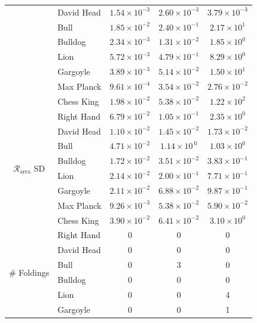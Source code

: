 \documentclass{article}
\numberwithin{equation}{section}
\begin{document}
\begin{table}[p]
{\begin{tabular}{clccc}
& David Head         &$1.54 \times 10^{-3}$  &$2.60 \times 10^{-3}$  &$3.79 \times 10^{-3}$\\
& Bull               &$1.85 \times 10^{-2}$  &$2.40 \times 10^{-1}$  &$2.17 \times 10^{1}$\\
& Bulldog            &$2.34 \times 10^{-3}$  &$1.31 \times 10^{-2}$  &$1.85 \times 10^{0}$\\
& Lion               &$5.72 \times 10^{-3}$  &$4.79 \times 10^{-1}$  &$8.29 \times 10^{0}$\\
& Gargoyle           &$3.89 \times 10^{-3}$  &$5.14 \times 10^{-2}$  &$1.50 \times 10^{1}$\\
& Max Planck         &$9.61 \times 10^{-4}$  &$3.54 \times 10^{-2}$  &$2.76 \times 10^{-2}$\\
& Chess King         &$1.98 \times 10^{-2}$  &$5.38 \times 10^{-2}$  &$1.22 \times 10^{2}$\\
\hline
\multirow{8}{*}{$\mathcal{R}_\mathrm{area}$ SD} 
& Right Hand         &$6.79 \times 10^{-2}$  &$1.05 \times 10^{-1}$  &$2.35 \times 10^{0}$\\
& David Head         &$1.10 \times 10^{-2}$  &$1.45 \times 10^{-2}$  &$1.73 \times 10^{-2}$\\
& Bull               &$4.71 \times 10^{-2}$  &$1.14 \times 10^{~0}$  &$1.03 \times 10^{0}$\\
& Bulldog            &$1.72 \times 10^{-2}$  &$3.51 \times 10^{-2}$  &$3.83 \times 10^{-1}$\\
& Lion               &$2.14 \times 10^{-2}$  &$2.00 \times 10^{-1}$  &$7.71 \times 10^{-1}$\\
& Gargoyle           &$2.11 \times 10^{-2}$  &$6.88 \times 10^{-2}$  &$9.87 \times 10^{-1}$\\
& Max Planck         &$9.26 \times 10^{-3}$  &$5.38 \times 10^{-2}$  &$5.90 \times 10^{-2}$\\
& Chess King         &$3.90 \times 10^{-2}$  &$6.41 \times 10^{-2}$  &$3.10 \times 10^{0}$\\
\hline
\multirow{8}{*}{$\#$ Foldings} 
& Right Hand         & 0       & 0      & 0\\
& David Head         & 0       & 0      & 0\\
& Bull               & 0       & 3      & 0\\
& Bulldog            & 0       & 0      & 0\\
& Lion               & 0       & 0      & 4\\
& Gargoyle           & 0       & 0      & 1\\

\end{tabular}}
\end{table}
\end{document}
